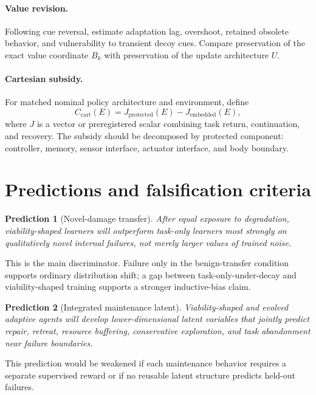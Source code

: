 \documentclass[11pt]{article}
\newtheorem{prediction}{Prediction}
\begin{document}
\paragraph{Value revision.}
Following cue reversal, estimate adaptation lag, overshoot, retained obsolete behavior, and vulnerability to transient decoy cues. Compare preservation of the exact value coordinate $B_k$ with preservation of the update architecture $U$.

\paragraph{Cartesian subsidy.}
For matched nominal policy architecture and environment, define
\begin{equation}
C_{\mathrm{cart}}(E)
=
J_{\mathrm{protected}}(E)-J_{\mathrm{embedded}}(E),
\label{eq:cartesian-subsidy}
\end{equation}
where $J$ is a vector or preregistered scalar combining task return, continuation, and recovery. The subsidy should be decomposed by protected component: controller, memory, sensor interface, actuator interface, and body boundary.

\section{Predictions and falsification criteria}

\begin{prediction}[Novel-damage transfer]
After equal exposure to degradation, viability-shaped learners will outperform task-only learners most strongly on qualitatively novel internal failures, not merely larger values of trained noise.
\end{prediction}

This is the main discriminator. Failure only in the benign-transfer condition supports ordinary distribution shift; a gap between task-only-under-decay and viability-shaped training supports a stronger inductive-bias claim.

\begin{prediction}[Integrated maintenance latent]
Viability-shaped and evolved adaptive agents will develop lower-dimensional latent variables that jointly predict repair, retreat, resource buffering, conservative exploration, and task abandonment near failure boundaries.
\end{prediction}

This prediction would be weakened if each maintenance behavior requires a separate supervised reward or if no reusable latent structure predicts held-out failures.
\end{document}
